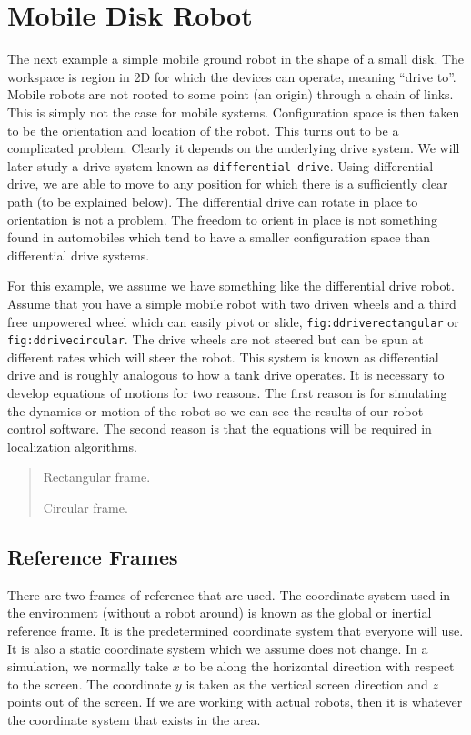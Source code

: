 \hypertarget{mobile-disk-robot}{%
\section{Mobile Disk Robot}\label{mobile-disk-robot}}

The next example a simple mobile ground robot in the shape of a small
disk. The workspace is region in 2D for which the devices can operate,
meaning ``drive to''. Mobile robots are not rooted to some point (an
origin) through a chain of links. This is simply not the case for mobile
systems. Configuration space is then taken to be the orientation and
location of the robot. This turns out to be a complicated problem.
Clearly it depends on the underlying drive system. We will later study a
drive system known as \texttt{differential\ drive}. Using differential
drive, we are able to move to any position for which there is a
sufficiently clear path (to be explained below). The differential drive
can rotate in place to orientation is not a problem. The freedom to
orient in place is not something found in automobiles which tend to have
a smaller configuration space than differential drive systems.

For this example, we assume we have something like the differential
drive robot. Assume that you have a simple mobile robot with two driven
wheels and a third free unpowered wheel which can easily pivot or slide,
\texttt{fig:ddriverectangular} or \texttt{fig:ddrivecircular}. The drive
wheels are not steered but can be spun at different rates which will
steer the robot. This system is known as differential drive and is
roughly analogous to how a tank drive operates. It is necessary to
develop equations of motions for two reasons. The first reason is for
simulating the dynamics or motion of the robot so we can see the results
of our robot control software. The second reason is that the equations
will be required in localization algorithms.

\begin{quote}
Rectangular frame.

Circular frame.
\end{quote}

\hypertarget{reference-frames}{%
\subsection{Reference Frames}\label{reference-frames}}

There are two frames of reference that are used. The coordinate system
used in the environment (without a robot around) is known as the global
or inertial reference frame. It is the predetermined coordinate system
that everyone will use. It is also a static coordinate system which we
assume does not change. In a simulation, we normally take \(x\) to be
along the horizontal direction with respect to the screen. The
coordinate \(y\) is taken as the vertical screen direction and \(z\)
points out of the screen. If we are working with actual robots, then it
is whatever the coordinate system that exists in the area.

